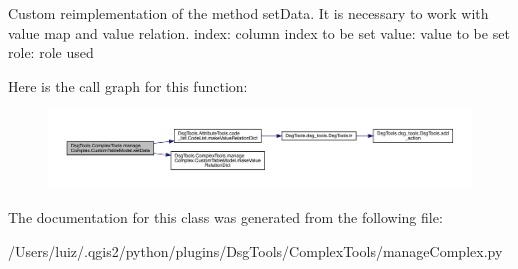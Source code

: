 \begin{DoxyVerb}Custom reimplementation of the method setData.
It is necessary to work with value map and value relation.
index: column index to be set
value: value to be set
role: role used
\end{DoxyVerb}
 Here is the call graph for this function\+:
\nopagebreak
\begin{figure}[H]
\begin{center}
\leavevmode
\includegraphics[width=350pt]{class_dsg_tools_1_1_complex_tools_1_1manage_complex_1_1_custom_table_model_a38742e74ac764ee395cac99b80ddd113_cgraph}
\end{center}
\end{figure}


The documentation for this class was generated from the following file\+:\begin{DoxyCompactItemize}
\item 
/\+Users/luiz/.\+qgis2/python/plugins/\+Dsg\+Tools/\+Complex\+Tools/manage\+Complex.\+py\end{DoxyCompactItemize}
